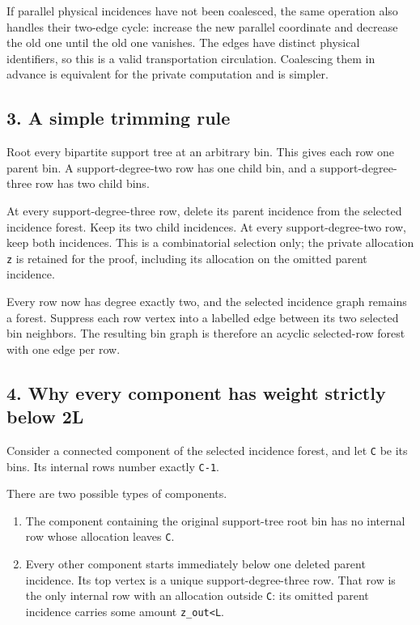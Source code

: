 If parallel physical incidences have not been coalesced, the same operation also handles their two-edge cycle: increase the new parallel coordinate and decrease the old one until the old one vanishes. The edges have distinct physical identifiers, so this is a valid transportation circulation. Coalescing them in advance is equivalent for the private computation and is simpler.

\hypertarget{af-c467a6f0ad-a-simple-trimming-rule}{%
\subsection{3. A simple trimming rule}\label{af-c467a6f0ad-a-simple-trimming-rule}}

Root every bipartite support tree at an arbitrary bin. This gives each row one parent bin. A support-degree-two row has one child bin, and a support-degree-three row has two child bins.

At every support-degree-three row, delete its parent incidence from the selected incidence forest. Keep its two child incidences. At every support-degree-two row, keep both incidences. This is a combinatorial selection only; the private allocation \texttt{z} is retained for the proof, including its allocation on the omitted parent incidence.

Every row now has degree exactly two, and the selected incidence graph remains a forest. Suppress each row vertex into a labelled edge between its two selected bin neighbors. The resulting bin graph is therefore an acyclic selected-row forest with one edge per row.

\hypertarget{af-c467a6f0ad-why-every-component-has-weight-strictly-below-2l}{%
\subsection{4. Why every component has weight strictly below 2L}\label{af-c467a6f0ad-why-every-component-has-weight-strictly-below-2l}}

Consider a connected component of the selected incidence forest, and let \texttt{C} be its bins. Its internal rows number exactly \texttt{\textbar{}C\textbar{}-1}.

There are two possible types of components.

\begin{enumerate}
\def\labelenumi{\arabic{enumi}.}
\tightlist
\item
  The component containing the original support-tree root bin has no internal row whose allocation leaves \texttt{C}.
\item
  Every other component starts immediately below one deleted parent incidence. Its top vertex is a unique support-degree-three row. That row is the only internal row with an allocation outside \texttt{C}: its omitted parent incidence carries some amount \texttt{z\_out\textless{}L}.
\end{enumerate}

